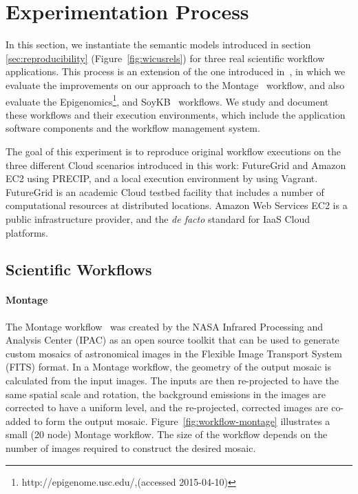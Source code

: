 \section{Experimentation Process}
\label{sec:experiment}


In this section, we instantiate the semantic models introduced in section \ref{sec:reproducibility}
(Figure~\ref{fig:wicusrels}) for three real scientific workflow applications. 
This process is an extension of the one introduced
 in~\cite{SantanaPerez-REPPAR-2014}, in which we evaluate the improvements on our
 approach to the Montage~\cite{Montage} workflow, and also evaluate the
 Epigenomics\footnote{http://epigenome.usc.edu/,(accessed 2015-04-10)}, and SoyKB~\cite{soybean, Joshi01012014} workflows.
We study and document these workflows and their execution environments, which include the application software components 
and the workflow management system.

The goal of this experiment is to reproduce original workflow executions on the three different 
Cloud scenarios introduced in this work: FutureGrid and Amazon EC2
using PRECIP, and a local execution environment by using Vagrant. 
FutureGrid is an academic Cloud testbed facility that includes a number of computational 
resources at distributed locations. Amazon Web Services EC2 is a public infrastructure provider, and the \emph{de facto} standard for IaaS Cloud platforms. 


\subsection{Scientific Workflows}

\paragraph{\textbf{Montage}}
The Montage workflow~\cite{Montage} was created by the NASA Infrared Processing 
and Analysis Center (IPAC) as an open source toolkit that can be used to generate 
custom mosaics of astronomical images in the Flexible Image Transport System (FITS) 
format. In a Montage workflow, the geometry of the output mosaic is calculated from the 
input images. The inputs are then re-projected to have the same spatial scale and rotation, 
the background emissions in the images are corrected to have a uniform level, and the 
re-projected, corrected images are co-added to form the output mosaic. 
Figure~\ref{fig:workflow-montage} illustrates a small (20 node) Montage workflow. The 
size of the workflow depends on the number of images required to construct the desired 
mosaic.

